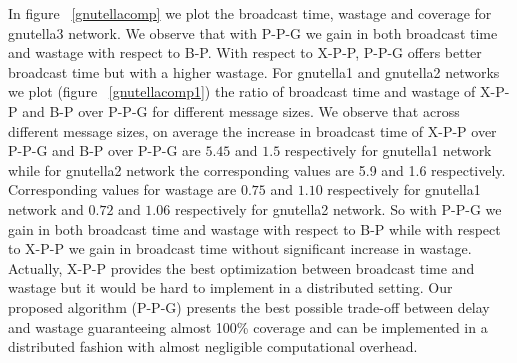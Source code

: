 In figure ~\ref{gnutellacomp} we plot the broadcast time, wastage and coverage for gnutella3 network. 
We observe that with P-P-G we gain in both broadcast time and wastage with respect to B-P. With respect to X-P-P, P-P-G offers better 
broadcast time but with a higher wastage.
For gnutella1 and gnutella2 networks 
we plot (figure ~\ref{gnutellacomp1}) the ratio of broadcast time and wastage of X-P-P and B-P over P-P-G for different message sizes. 
We observe that across different message sizes, on average the increase in broadcast time of X-P-P over P-P-G and B-P over P-P-G are $5.45$ and $1.5$ respectively for 
gnutella1 network while for gnutella2 network the corresponding values are 5.9 and 1.6 respectively. Corresponding values for wastage are $0.75$ and $1.10$ 
respectively for gnutella1 network and $0.72$ and $1.06$ respectively for gnutella2 network. 
So with P-P-G we gain in both broadcast time and wastage with respect to B-P while with respect to X-P-P 
we gain in broadcast time without significant increase in wastage.
 Actually, X-P-P provides the best optimization between broadcast time and wastage but it would be hard to implement in a 
distributed setting. 
Our proposed algorithm (P-P-G) presents the best possible trade-off between delay and wastage guaranteeing almost 100\% coverage and can be implemented in a distributed fashion with almost negligible computational overhead.
